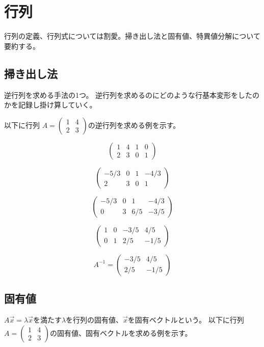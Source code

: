 \documentclass[b5paper,12pt]{jarticle}
\begin{document}
\section{行列}
行列の定義、行列式については割愛。掃き出し法と固有値、特異値分解について要約する。
\subsection{掃き出し法}
逆行列を求める手法の1つ。
逆行列を求めるのにどのような行基本変形をしたのかを記録し掛け算していく。

以下に行列
$A = \left(
    \begin{array}{cc}
        1 & 4 \\
        2 & 3 
    \end{array}
\right)$の逆行列を求める例を示す。

\[
    \left(
        \begin{array}{cc|cc}
            1 & 4 & 1 & 0 \\
            2 & 3 & 0 & 1 
        \end{array}        
    \right)
\]

\[
    \left(
        \begin{array}{cc|cc}
            -5/3 & 0 & 1 & -4/3 \\
            2 & 3 & 0 & 1 
        \end{array}        
    \right)
\]

\[
    \left(
        \begin{array}{cc|cc}
            -5/3 & 0 & 1 & -4/3 \\
            0 & 3 & 6/5 & -3/5 
        \end{array}        
    \right)
\]

\[
    \left(
        \begin{array}{cc|cc}
            1 & 0 & -3/5 & 4/5 \\
            0 & 1 & 2/5 & -1/5 
        \end{array}        
    \right)
\]

\[
    A^{-1} =
    \left(
        \begin{array}{cc}
            -3/5 & 4/5 \\
            2/5 & -1/5 
        \end{array}        
    \right)
\]

\subsection{固有値}
$A\vec{x}=\lambda\vec{x}$を満たす$\lambda$を行列の固有値、$\vec{x}$を固有ベクトルという。
以下に行列
$A = \left(
    \begin{array}{cc}
        1 & 4 \\
        2 & 3 
    \end{array}
\right)$の固有値、固有ベクトルを求める例を示す。
\end{document}
